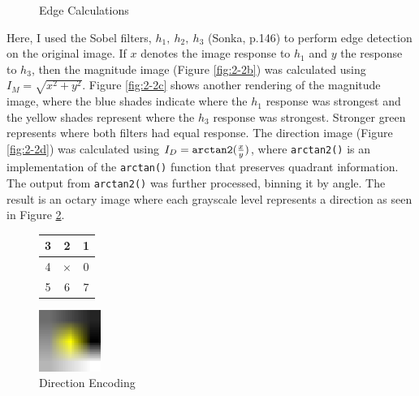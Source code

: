 \documentclass[aps,letterpaper,10pt]{article}
\newcommand{\ttt}{\texttt}
\begin{document}
\begin{figure}[!h]
\caption{Edge Calculations}
\label{2-2}
\end{figure}
Here, I used the Sobel filters, $h_1,\ h_2,\ h_3$ (Sonka, p.146) to perform edge detection on the original image.  If $x$ denotes the image response to $h_1$ and $y$ the response to $h_3$, then the magnitude image (Figure \ref{fig:2-2b}) was calculated using $I_M=\sqrt{x^2+y^2}$.  Figure \ref{fig:2-2c} shows another rendering of the magnitude image, where the blue shades indicate where the $h_1$ response was strongest and the yellow shades represent where the $h_3$ response was strongest.  Stronger green represents where both filters had equal response. The direction image (Figure \ref{fig:2-2d}) was calculated using $I_D=\text{\ttt{arctan2}}(\frac{x}{y})$, where  \ttt{arctan2()} is an implementation of the \ttt{arctan()} function that preserves quadrant information.  The output from \ttt{arctan2()} was further processed, binning it by angle.  The result is an octary image where each grayscale level represents a direction as seen in Figure \ref{fig:encodings}.
\begin{figure}[!h]
\centering
\begin{minipage}[c]{3cm}
\centering
\renewcommand{\arraystretch}{1.5}
\renewcommand{\tabcolsep}{0.2cm}
\begin{tabular}{|c|c|c|}
\hline
3 & 2 & 1 \\
\hline
4 & $\times$ & 0 \\
\hline
5 & 6 & 7\\
\hline
\end{tabular}
\end{minipage}
\begin{minipage}[c]{3cm}
\centering
\includegraphics[width=2cm]{imguide.png}
\end{minipage}
\caption{Direction Encoding}
\label{fig:encodings}
\end{figure}
\end{document}
